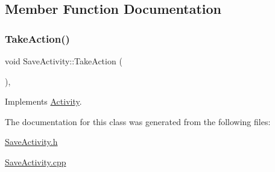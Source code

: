 \subsection{Member Function Documentation}
\mbox{\label{class_save_activity_af8bd3121c8109caedd8f4ae481879f1a}} 
\subsubsection{\texorpdfstring{TakeAction()}{TakeAction()}}
{\footnotesize\ttfamily void Save\+Activity\+::\+Take\+Action (\begin{DoxyParamCaption}{ }\end{DoxyParamCaption})\hspace{0.3cm}{\ttfamily [override]}, {\ttfamily [virtual]}}



Implements \mbox{\hyperlink{class_activity_af1bed13c5ae595ee7940dee2d34f7989}{Activity}}.



The documentation for this class was generated from the following files\+:\begin{DoxyCompactItemize}
\item 
\mbox{\hyperlink{_save_activity_8h}{Save\+Activity.\+h}}\item 
\mbox{\hyperlink{_save_activity_8cpp}{Save\+Activity.\+cpp}}\end{DoxyCompactItemize}
